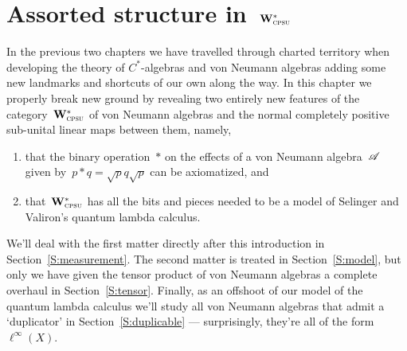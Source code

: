 \documentclass[a]{subfiles}
\begin{document}
\chapter{Assorted structure in~$\mathbf{W}^*_{\text{\textsc{cpsu}}}$}
In the previous two chapters
we have travelled through
charted territory
when developing the theory of $C^*$-algebras
and von Neumann algebras
adding some new landmarks and shortcuts
of our own along the way.
In this chapter
we properly break new ground
by revealing
two entirely new features
of the category~$\mathbf{W}^*_{\text{\textsc{cpsu}}}$
of von Neumann algebras
and the normal completely positive sub-unital
linear maps between them,
namely, 
\begin{enumerate}
\item 
that the binary operation~$\ast$
on the effects of a von Neumann algebra~$\mathscr{A}$
given by~$p\ast q = \sqrt{p}q\sqrt{p}$
can be axiomatized,
and 
\item 
	that~$\mathbf{W}^*_{\text{\textsc{cpsu}}}$
has all the bits and pieces
needed to be a model of Selinger and Valiron's quantum lambda calculus.
\end{enumerate}
We'll deal with the first matter directly after this introduction
in Section~\ref{S:measurement}.
The second matter is treated in Section~\ref{S:model},
but only
we have given the tensor product of von Neumann 
algebras a complete overhaul
in Section~\ref{S:tensor}.
Finally, as an offshoot of our model
of the quantum lambda calculus
we'll study all
 von Neumann algebras
that admit a `duplicator'
in Section~\ref{S:duplicable}
---
surprisingly, they're
all of the form $\ell^\infty(X)$.
\end{document}
